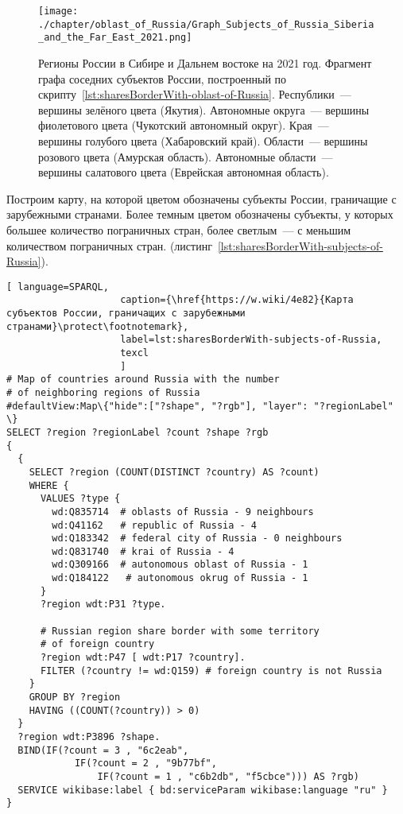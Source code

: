 \begin{fullwidth}
\begin{figure*}[h]
	\texttt{[image: ./chapter/oblast\_of\_Russia/Graph\_Subjects\_of\_Russia\_Siberia\_and\_the\_Far\_East\_2021.png]}
	\caption[Граф субъектов России. Калининград, 2021.]{Регионы России в Сибире и Дальнем востоке на 2021 год. Фрагмент графа соседних субъектов России, построенный по скрипту~\protect\ref{lst:sharesBorderWith-oblast-of-Russia}.
	Республики~--- вершины зелёного цвета (Якутия).
	Автономные округа~--- вершины фиолетового цвета (Чукотский автономный округ).
	Края~--- вершины голубого цвета (Хабаровский край).
	Области~--- вершины розового цвета (Амурская область).
	Автономные области~--- вершины салатового цвета (Еврейская автономная область).}%
      \label{fig:sharesBorderWith-oblast-of-Russia-Kaliningrad-fig}%
\end{figure*} 
\end{fullwidth}

\newpage
Построим карту, на которой цветом обозначены субъекты России, граничащие с зарубежными странами. Более темным цветом обозначены субъекты, у которых большее количество пограничных стран, более светлым~--- с меньшим количеством пограничных стран. (листинг~\ref{lst:sharesBorderWith-subjects-of-Russia}).

\lstset{numbers=left, firstnumber=1, frame=single}
\begin{lstlisting}[ language=SPARQL, 
                    caption={\href{https://w.wiki/4e82}{Карта субъектов России, граничащих с зарубежными странами}\protect\footnotemark},
                    label=lst:sharesBorderWith-subjects-of-Russia,
                    texcl 
                    ]
# Map of countries around Russia with the number 
# of neighboring regions of Russia
#defaultView:Map\{"hide":["?shape", "?rgb"], "layer": "?regionLabel" \}
SELECT ?region ?regionLabel ?count ?shape ?rgb
{
  {
    SELECT ?region (COUNT(DISTINCT ?country) AS ?count)
    WHERE {
      VALUES ?type {
        wd:Q835714  # oblasts of Russia - 9 neighbours
        wd:Q41162   # republic of Russia - 4
        wd:Q183342  # federal city of Russia - 0 neighbours
        wd:Q831740  # krai of Russia - 4
        wd:Q309166  # autonomous oblast of Russia - 1
        wd:Q184122   # autonomous okrug of Russia - 1
      }
      ?region wdt:P31 ?type.
  
      # Russian region share border with some territory 
      # of foreign country
      ?region wdt:P47 [ wdt:P17 ?country].
      FILTER (?country != wd:Q159) # foreign country is not Russia
    }
    GROUP BY ?region
    HAVING ((COUNT(?country)) > 0)
  }
  ?region wdt:P3896 ?shape.
  BIND(IF(?count = 3 , "6c2eab", 
            IF(?count = 2 , "9b77bf", 
                IF(?count = 1 , "c6b2db", "f5cbce"))) AS ?rgb)
  SERVICE wikibase:label { bd:serviceParam wikibase:language "ru" }  
}
\end{lstlisting}%


